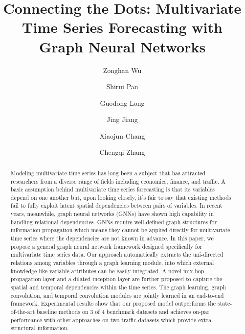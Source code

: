 \documentclass[sigconf]{acmart}
\begin{document}
\fancyhead{}




\title{Connecting the Dots:  Multivariate Time Series Forecasting with Graph Neural Networks}




\author{Zonghan Wu}

\author{Shirui Pan}

\author{Guodong Long}

\author{Jing Jiang}

\author{Xiaojun Chang}

\author{Chengqi Zhang}


\renewcommand{\shortauthors}{Wu, et al.}

\begin{abstract}
Modeling multivariate time series has long been a subject that has attracted researchers from a diverse range of fields including economics, finance, and traffic. A basic assumption behind multivariate time series forecasting is that its variables depend on one another but, upon looking closely, it's fair to say that existing methods fail to fully exploit latent spatial dependencies between pairs of variables. In recent years, meanwhile, graph neural networks (GNNs) have shown high capability in handling relational dependencies. GNNs require well-defined graph structures for information propagation which means they cannot be applied directly for multivariate time series where the dependencies are not known in advance. In this paper, we propose a general graph neural network framework designed specifically for multivariate time series data. Our approach automatically extracts the uni-directed relations among variables through a graph learning module, into which external knowledge like variable attributes can be easily integrated. A novel mix-hop propagation layer and a dilated inception layer are further proposed to capture the spatial and temporal dependencies within the time series. The graph learning, graph convolution, and temporal convolution modules are jointly learned in an end-to-end framework. Experimental results  
show that our proposed model outperforms the state-of-the-art baseline methods on 3 of 4 benchmark datasets and achieves on-par performance with other approaches on two traffic datasets which provide extra structural information.
\end{abstract}
\end{document}
